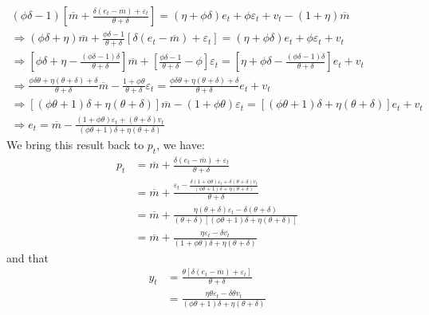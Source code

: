 \documentclass[a4paper,12pt]{article} %
\theoremstyle{nonitalic}
\begin{document}
\begin{gather*}
    (\phi \delta - 1) \left[ \overline{m} + \frac{\delta (e_t - \overline{m}) + \varepsilon_t}{\theta + \delta} \right] = (\eta + \phi \delta )e_t + \phi \varepsilon_t + v_t - (1 + \eta)\overline{m} \\
    \Rightarrow (\phi \delta + \eta) \overline{m} + \frac{\phi \delta - 1}{\theta + \delta} \left[ \delta (e_t - \overline{m}) + \varepsilon_t \right] = (\eta + \phi \delta )e_t + \phi \varepsilon_t + v_t \\
    \Rightarrow \left[ \phi \delta + \eta - \frac{(\phi \delta - 1) \delta}{\theta + \delta} \right] \overline{m} + \left[ \frac{\phi \delta - 1}{\theta + \delta} - \phi \right]\varepsilon_t = \left[ \eta + \phi \delta - \frac{(\phi \delta - 1) \delta}{\theta + \delta} \right]e_t + v_t \\
    \Rightarrow \frac{\phi \delta \theta + \eta (\theta + \delta) + \delta}{\theta + \delta} \overline{m} - \frac{1 + \phi \theta}{\theta + \delta} \varepsilon_t = \frac{\phi \delta \theta + \eta (\theta + \delta) + \delta }{\theta + \delta} e_t + v_t \\
    \Rightarrow \left[ (\phi \theta + 1)\delta + \eta (\theta + \delta) \right] \overline{m} - (1 + \phi \theta) \varepsilon_t = \left[ (\phi \theta + 1)\delta + \eta (\theta + \delta) \right] e_t + v_t \\
    \Rightarrow e_t = \overline{m} - \frac{(1 + \phi \theta)\varepsilon_t + (\theta + \delta)v_t}{(\phi \theta + 1)\delta + \eta (\theta + \delta)} \tag{2.1.2}
\end{gather*}
We bring this result back to $p_t$, we have:
\begin{align*}
    p_t &= \overline{m} + \frac{\delta (e_t - \overline{m}) + \varepsilon_t}{\theta + \delta} \\
        &= \overline{m} + \frac{ \varepsilon_t - \frac{\delta (1 + \phi \theta) \varepsilon_t + \delta(\theta + \delta)v_t}{(\phi \theta + 1)\delta + \eta (\theta + \delta)} }{\theta + \delta} \\
        &= \overline{m} + \frac{\eta (\theta + \delta)\varepsilon_t - \delta (\theta + \delta)}{(\theta + \delta) \left[ (\phi \theta + 1)\delta + \eta (\theta + \delta) \right]} \\
        &= \overline{m} + \frac{\eta \varepsilon_t - \delta v_t}{(1 + \phi \theta)\delta + \eta (\theta + \delta)} \tag{2.1.3}
\end{align*}
and that
\begin{align*}
    y_t &= \frac{\theta \left[\delta (e_t - \overline{m}) + \varepsilon_t \right]}{\theta + \delta} \\
        &= \frac{\eta \theta \varepsilon_t - \delta \theta v_t}{(\phi \theta + 1)\delta + \eta (\theta + \delta)} \tag{2.1.4}
\end{align*}
\end{document}
